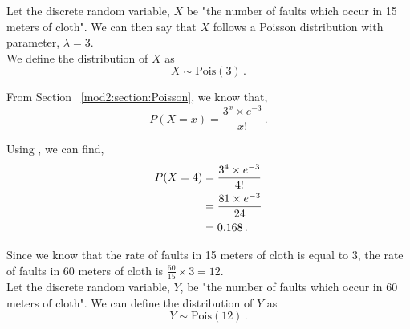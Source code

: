 %
%

\begin{subquestions}
\subquestion

\begin{subsubquestions}
	
\subsubquestion

Let the discrete random variable, $X$ be "the number of faults which occur in 15 meters of cloth". We can then say that $X$ follows a Poisson distribution with parameter, $\lambda = 3$. \\
We define the distribution of $X$ as
\begin{equation}
	X \sim \text{Pois}(3) \,.
\end{equation}
	
From Section ~\ref{mod2:section:Poisson}, we know that,
\begin{equation}
	P(X=x) = \frac{3^{x} \times e^{-3}}{x!} \,. \label{2014:q4:PoisEqn}
\end{equation}
	
Using , we can find,
\begin{align}
	P(X=4) & = \frac{3^{4} \times e^{-3}}{4!} \nonumber \\
	       & = \frac{81 \times e^{-3}}{24} \nonumber \\
	       & = 0.168 \,.
\end{align} 


\subsubquestion

Since we know that the rate of faults in 15 meters of cloth is equal to 3, the rate of faults in 60 meters of cloth is $\frac{60}{15} \times 3 = 12$. \\
Let the discrete random variable, $Y$, be "the number of faults which occur in 60 meters of cloth". We can define the distribution of $Y$ as
\begin{equation}
	Y \sim \text{Pois}(12) \,.
\end{equation}


\end{subsubquestions}
\end{subquestions}
